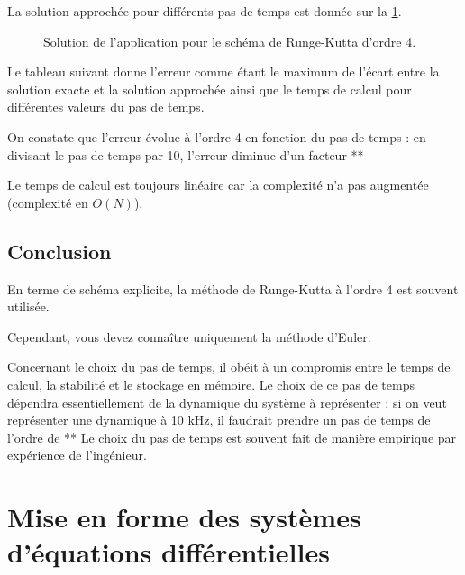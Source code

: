 \documentclass[10pt]{article}
\begin{document}
La solution approchée pour différents pas de temps est donnée sur la \ref{rk4}.

\begin{figure}[!ht]
\centering
\caption{Solution de l'application pour le schéma de Runge-Kutta d'ordre 4.}
\label{rk4}
\end{figure}

Le tableau suivant donne l'erreur comme étant le maximum de l'écart entre la solution exacte et la solution approchée ainsi que le temps de calcul pour différentes valeurs du pas de temps.


\begin{center}
\end{center}

On constate que l'erreur évolue à l'ordre 4 en fonction du pas de temps : en divisant le pas de temps par 10, l'erreur diminue d'un facteur **%

Le temps de calcul est toujours linéaire car la complexité n'a pas augmentée (complexité en $O(N)$).

\subsection{Conclusion}
En terme de schéma explicite, la méthode de Runge-Kutta à l'ordre 4 est souvent utilisée.

Cependant, vous devez connaître uniquement la méthode d'Euler.

Concernant le choix du pas de temps, il obéit à un compromis entre le temps de calcul, la stabilité et le stockage en mémoire. Le choix de ce pas de temps dépendra essentiellement de la dynamique du système à représenter : si on veut représenter une dynamique à 10 kHz, il faudrait prendre un pas de temps de l'ordre de **%
Le choix du pas de temps est souvent fait de manière empirique par expérience de l'ingénieur. 

\section{Mise en forme des systèmes d'équations différentielles}
\end{document}
